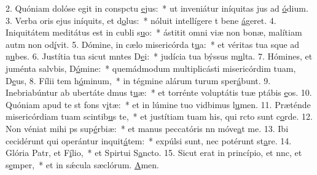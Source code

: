 2. Quóniam dolóse egit in conspctu \uline{e}jus:~* ut inveniátur iníquitas jus ad \uline{ó}dium.
3. Verba oris ejus iníquits, et d\uline{o}lus:~* nóluit intellígere t bene \uline{á}geret.
4. Iniquitátem meditátus est in cubli s\uline{u}o:~* ástitit omni viæ non bonæ, malítiam autm non od\uline{í}vit.
5. Dómine, in cælo misericórda t\uline{u}a:~* et véritas tua sque ad n\uline{u}bes.
6. Justítia tua sicut mntes D\uline{e}i:~* judícia tua býssus m\uline{u}lta.
7. Hómines, et juménta salvbis, D\uline{ó}mine:~* quemádmodum multiplicásti misericórdim tuam, D\uline{e}us,
8. Fílii tem h\uline{ó}minum,~* in tégmine alárum turum sper\uline{á}bunt.
9. Inebriabúntur ab ubertáte dmus t\uline{u}æ:~* et torrénte voluptátis tuæ ptábis \uline{e}os.
10. Quóniam apud te st fons v\uline{i}tæ:~* et in lúmine tuo vidbimus l\uline{u}men.
11. Præténde misericórdiam tuam scintib\uline{u}s te,~* et justítiam tuam his, qui rcto sunt c\uline{o}rde.
12. Non véniat mihi ps sup\uline{é}rbiæ:~* et manus peccatóris nn móve\uline{a}t me.
13. Ibi cecidérunt qui operántur inquit\uline{á}tem:~* expúlsi sunt, nec potérunt st\uline{a}re.
14. Glória Patr, et F\uline{í}lio,~* et Spirtui S\uline{a}ncto.
15. Sicut erat in princípio, et nnc, et s\uline{e}mper,~* et in sǽcula sæclórum. \uline{A}men.
